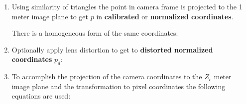 \documentclass[10pt,a4paper]{scrartcl}
\begin{document}
\begin{multicols*}{2}
\begin{enumerate}


\item Using similarity of triangles the point in camera frame is projected to the 1 meter image plane to get $p$ in \textbf{calibrated} or \textbf{normalized coordinates}.


There is a homogeneous form of the same coordinates:

\item Optionally apply lens distortion to get to \textbf{distorted normalized coordinates} $p_d$:

\item To accomplish the projection of the camera coordinates to the $Z_c$ meter image plane and the transformation to pixel coordinates the following equations are used:


\end{enumerate}
\end{multicols*}
\end{document}
